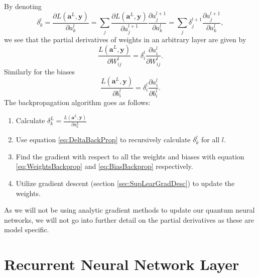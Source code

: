 By denoting  \cite{NeuralNetworkSystematicIntro}
\begin{equation}
    \label{eq:DeltaBackProp}
    \delta^l_k = \frac{\partial L(\boldsymbol{a}^L,\boldsymbol{y})}{\partial a^{l}_k} =  \sum_j\frac{\partial L(\boldsymbol{a}^L,\boldsymbol{y})}{\partial a^{l+1}_j}\frac{\partial a^{l+1}_j}{\partial a^{l}_k} = \sum_j \delta_j^{l+1}\frac{\partial a^{l+1}_j}{\partial a^{l}_k} ,
\end{equation}
we see that the partial derivatives of weights in an arbitrary layer are given by
\begin{equation}
    \label{eq:WeightsBackprop}
    \frac{L(\boldsymbol{a}^L,\boldsymbol{y})}{\partial W^{l}_{ij}} = \delta^l_i\frac{\partial a^l_i}{\partial W^l_{ij}}.
\end{equation}
Similarly for the biases
\begin{equation}
    \label{eq:BiasBackprop}
    \frac{L(\boldsymbol{a}^L,\boldsymbol{y})}{\partial b^{l}_{i}} = \delta^l_i\frac{\partial a^l_i}{\partial b^l_{i}}.
\end{equation}
The backpropagation algorithm goes as follows:
\begin{enumerate}[Step 1:]
\item Calculate $\delta^L_k = \frac{L(\boldsymbol{a}^L,\boldsymbol{y})}{\partial a^{L}_{k}} $
\item Use equation \ref{eq:DeltaBackProp} to recursively calculate $\delta^l_k$ for all $l$.
\item Find the gradient with respect to all the weights and biases with equation \ref{eq:WeightsBackprop} and \ref{eq:BiasBackprop} respectively.
\item Utilize gradient descent (section \ref{sec:SupLearGradDesc}) to update the weights.
\end{enumerate}
As we will not be using analytic gradient methods to update our quantum neural networks, we will not go into further detail on the partial derivatives as these are model specific.

\section{Recurrent Neural Network Layer}
\label{sec:SupLearRNN}

